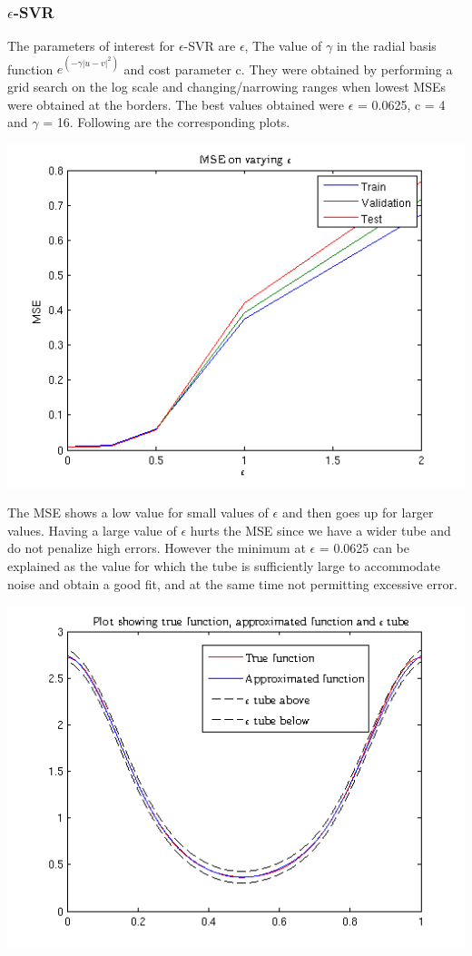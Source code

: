 \documentclass{article}
\begin{document}
\subsubsection{$\epsilon$-SVR}
The parameters of interest for $\epsilon$-SVR are $\epsilon$, The value of $\gamma$ in the radial basis function $e^{(-\gamma|u-v|^2)}$ and cost parameter c. They were obtained by performing a grid search on the log scale and changing/narrowing ranges when lowest MSEs were obtained at the borders.
The best values obtained were $\epsilon$ = 0.0625, c = 4 and $\gamma$ = 16. Following are the corresponding plots.
\begin{center}
\includegraphics[scale=1]{Regression/mse}
\end{center}
The MSE shows a low value for small values of $\epsilon$ and then goes up for larger values. Having a large value of $\epsilon$ hurts the MSE since we have a wider tube and do not penalize high errors. However the minimum at $\epsilon$ = 0.0625 can be explained as the value for which the tube is sufficiently large to accommodate noise and obtain a good fit, and at the same time not permitting excessive error.
\begin{center}
\includegraphics[scale=1]{Regression/Plot_1}
\end{center}
\end{document}
